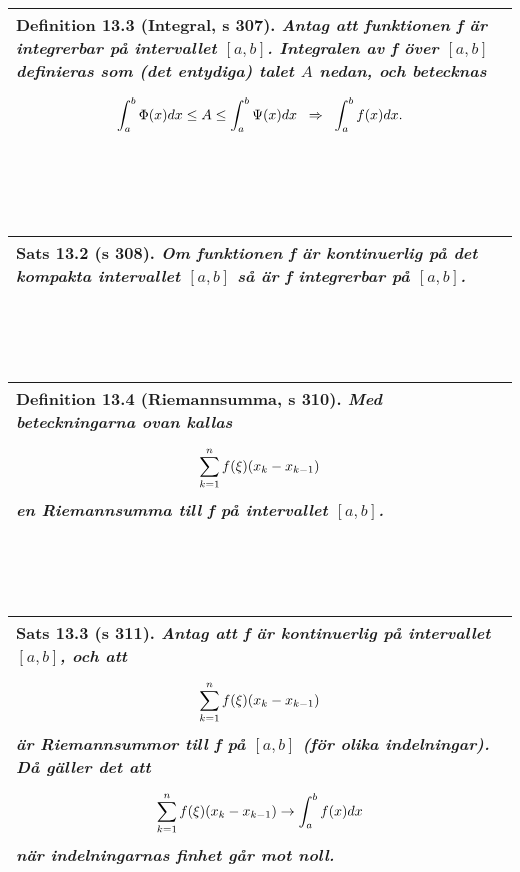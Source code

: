 \documentclass[a4paper]{article}
\begin{document}
\\\\\\
\begin{tabular}{|L{11.5cm}|} \hline
\textbf{Definition 13.3} (Integral, s 307).
\textit{Antag att funktionen f är integrerbar på intervallet $[a,b]$. \textbf{Integralen} av f över $[a,b]$ definieras som (det entydiga) talet $A$ nedan, och betecknas}
\begin{equation*}
\renewcommand{\arraystretch}{2.5}
\begin{array}{>{\displaystyle}c}
\int_{a}^{b}\Phi(x)dx \leq A \leq \int_{a}^{b}\Psi(x)dx \hspace{0.2cm}\Rightarrow \hspace{0.2cm} \int_{a}^{b}f(x)dx.
\end{array}
\end{equation*}
\\\hline
\end{tabular}
\\\\\\
\begin{tabular}{|L{11.5cm}|} \hline
\textbf{Sats 13.2} (s 308).
\textit{Om funktionen f är kontinuerlig på det kompakta intervallet $[a,b]$ så är f integrerbar på $[a,b]$.}
\\\hline
\end{tabular}
\\\\\\
\begin{tabular}{|L{11.5cm}|} \hline
\textbf{Definition 13.4} (Riemannsumma, s 310).
\textit{Med beteckningarna ovan kallas}
\begin{equation*}
\renewcommand{\arraystretch}{2.5}
\begin{array}{>{\displaystyle}c}
\sum_{k=1}^{n}f(\xi)(x_k-x_{k-1})
\end{array}
\end{equation*}
\textit{en \textbf{Riemannsumma} till f på intervallet $[a,b]$.}
\\\hline
\end{tabular}
\\\\\\
\begin{tabular}{|L{11.5cm}|} \hline
\textbf{Sats 13.3} (s 311).
\textit{Antag att f är kontinuerlig på intervallet $[a,b]$, och att}
\begin{equation*}
\renewcommand{\arraystretch}{2.5}
\begin{array}{>{\displaystyle}c}
\sum_{k=1}^{n}f(\xi)(x_k-x_{k-1})
\end{array}
\end{equation*}
\textit{är Riemannsummor till f på $[a,b]$ (för olika indelningar). Då gäller det att}
\begin{equation*}
\renewcommand{\arraystretch}{2.5}
\begin{array}{>{\displaystyle}c}
\sum_{k=1}^{n}f(\xi)(x_k-x_{k-1})\to \int_{a}^{b}f(x)dx
\end{array}
\end{equation*}
\textit{när indelningarnas finhet går mot noll.}
\\\hline
\end{tabular}
\end{document}
